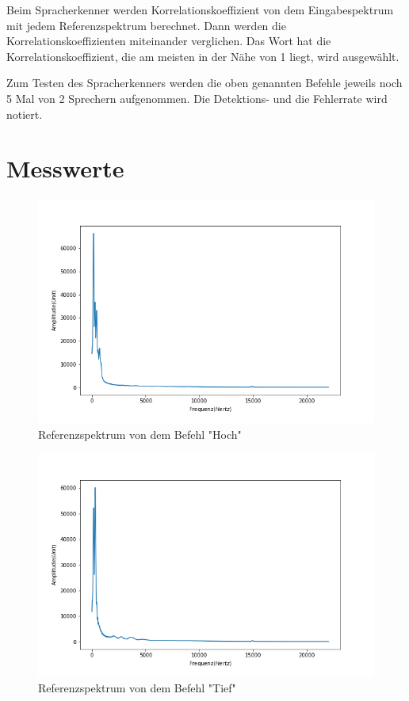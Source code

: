 \documentclass[12pt, oneside, a4paper, \docLanguage]{report}
\begin{document}
Beim Spracherkenner werden Korrelationskoeffizient von dem Eingabespektrum mit jedem Referenzspektrum berechnet. Dann werden die Korrelationskoeffizienten miteinander verglichen. Das Wort hat die Korrelationskoeffizient, die am meisten in der Nähe von 1 liegt, wird ausgewählt.

Zum Testen des Spracherkenners werden die oben genannten Befehle jeweils noch 5 Mal von 2 Sprechern aufgenommen. Die Detektions- und die Fehlerrate wird notiert.

\section{Messwerte}
\label{chap:VERSUCH_2_MESSWERTE}
\begin{figure}[H]
	\centering\small
	\includegraphics[width=12cm]{spektrum_mittel_windowshoch.png}
	\caption{Referenzspektrum von dem Befehl "Hoch"}
\end{figure}

\begin{figure}[H]
	\centering\small
	\includegraphics[width=12cm]{spektrum_mittel_windowstief.png}
	\caption{Referenzspektrum von dem Befehl "Tief"}
\end{figure}
\end{document}
